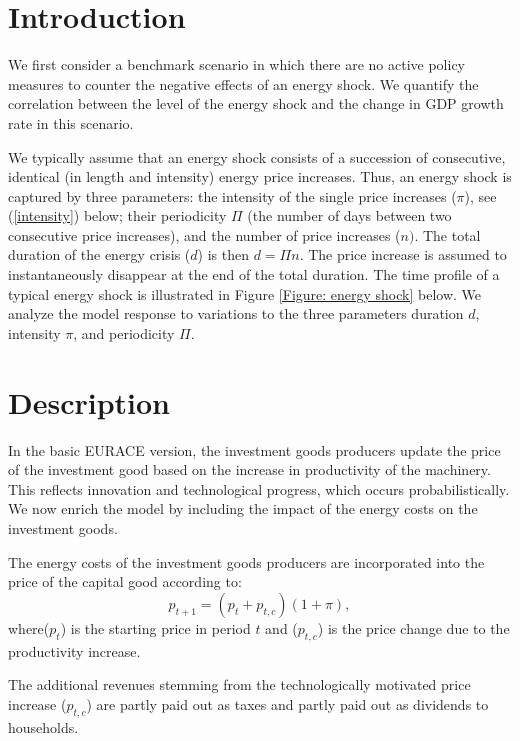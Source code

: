 \section{Introduction }

We first consider a benchmark scenario in which there are no active policy
measures to counter the negative effects of an energy shock. We quantify the
correlation between the level of the energy shock and the change in GDP
growth rate in this scenario.

We typically assume that an energy shock consists of a succession of
consecutive, identical (in length and intensity) energy price increases.
Thus, an energy shock is captured by three parameters: the intensity of the
single price increases ($\pi $), see (\ref{intensity}) below; their
periodicity $\Pi $ (the number of days between two consecutive price
increases), and the number of price increases ($n).$ The total duration of
the energy crisis ($d$) is then $d=\Pi n$. The price increase is assumed to
instantaneously disappear at the end of the total duration. The time profile
of a typical energy shock is illustrated in Figure \ref{Figure: energy shock}
below. We analyze the model response to variations to the three parameters
duration $d$, intensity $\pi $, and periodicity $\Pi $.

\section{Description}

In the basic EURACE version, the investment goods producers update the price
of the investment good based on the increase in productivity of the
machinery. This reflects innovation and technological progress, which occurs
probabilistically. We now enrich the model by including the impact of the
energy costs on the investment goods.

The energy costs of the investment goods producers are incorporated into the
price of the capital good according to: 
\begin{equation}
p_{t+1}=(p_{t}+p_{t,c})(1+\pi ),  \label{intensity}
\end{equation}%
where($p_{t}$) is the starting price in period $t$ and ($p_{t,c}$) is the
price change due to the productivity increase.

The additional revenues stemming from the technologically motivated price
increase ($p_{t,c}$) are partly paid out as taxes and partly paid out as
dividends to households.

